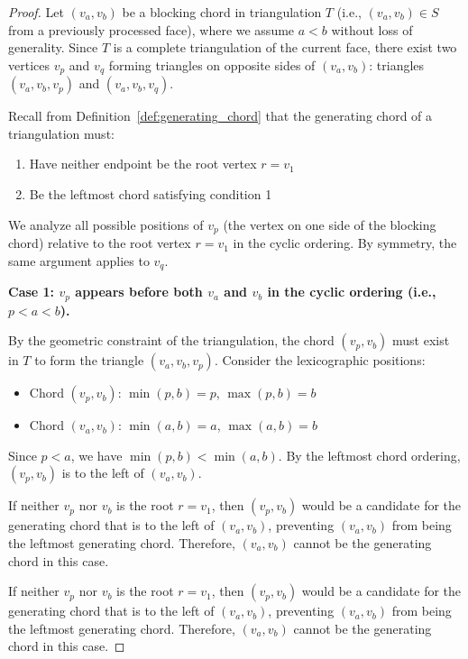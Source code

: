 \documentclass[12pt,a4paper]{article}
\theoremstyle{definition}
\theoremstyle{remark}
\begin{document}
\begin{proof}
Let $(v_a, v_b)$ be a blocking chord in triangulation $T$ (i.e., $(v_a, v_b) \in S$ from a previously processed face), where we assume $a < b$ without loss of generality. Since $T$ is a complete triangulation of the current face, there exist two vertices $v_p$ and $v_q$ forming triangles on opposite sides of $(v_a, v_b)$: triangles $(v_a, v_b, v_p)$ and $(v_a, v_b, v_q)$.

Recall from Definition~\ref{def:generating_chord} that the generating chord of a triangulation must:
\begin{enumerate}
    \item Have neither endpoint be the root vertex $r = v_1$
    \item Be the leftmost chord satisfying condition 1
\end{enumerate}

We analyze all possible positions of $v_p$ (the vertex on one side of the blocking chord) relative to the root vertex $r = v_1$ in the cyclic ordering. By symmetry, the same argument applies to $v_q$.

\textbf{Case 1: $v_p$ appears before both $v_a$ and $v_b$ in the cyclic ordering (i.e., $p < a < b$).}

By the geometric constraint of the triangulation, the chord $(v_p, v_b)$ must exist in $T$ to form the triangle $(v_a, v_b, v_p)$. Consider the lexicographic positions:
\begin{itemize}
    \item Chord $(v_p, v_b)$: $\min(p, b) = p$, $\max(p, b) = b$
    \item Chord $(v_a, v_b)$: $\min(a, b) = a$, $\max(a, b) = b$
\end{itemize}

Since $p < a$, we have $\min(p, b) < \min(a, b)$. By the leftmost chord ordering, $(v_p, v_b)$ is to the left of $(v_a, v_b)$. 

If neither $v_p$ nor $v_b$ is the root $r = v_1$, then $(v_p, v_b)$ would be a candidate for the generating chord that is to the left of $(v_a, v_b)$, preventing $(v_a, v_b)$ from being the leftmost generating chord. Therefore, $(v_a, v_b)$ cannot be the generating chord in this case.

If neither $v_p$ nor $v_b$ is the root $r = v_1$, then $(v_p, v_b)$ would be a candidate for the generating chord that is to the left of $(v_a, v_b)$, preventing $(v_a, v_b)$ from being the leftmost generating chord. Therefore, $(v_a, v_b)$ cannot be the generating chord in this case.


\end{proof}
\end{document}
